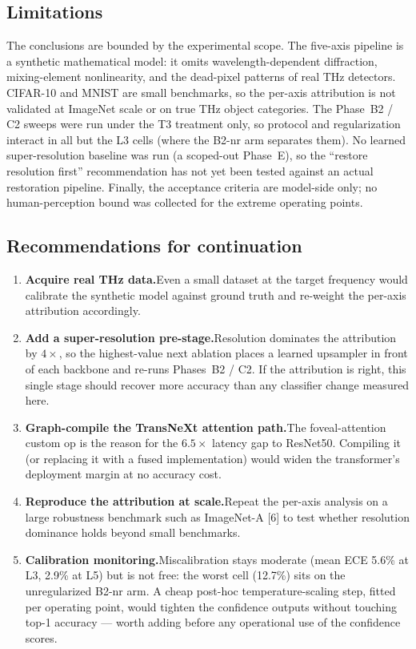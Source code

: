\subsection{Limitations}
The conclusions are bounded by the experimental scope. The five-axis pipeline
is a synthetic mathematical model: it omits wavelength-dependent diffraction,
mixing-element nonlinearity, and the dead-pixel patterns of real THz
detectors. CIFAR-10 and MNIST are small benchmarks, so the per-axis
attribution is not validated at ImageNet scale or on true THz object
categories. The Phase~B2 / C2 sweeps were run under the T3 treatment only, so
protocol and regularization interact in all but the L3 cells (where the
B2-nr arm separates them). No learned super-resolution baseline was run (a
scoped-out Phase~E), so the ``restore resolution first'' recommendation has
not yet been tested against an actual restoration pipeline. Finally, the
acceptance criteria are model-side only; no human-perception bound was
collected for the extreme operating points.

\subsection{Recommendations for continuation}
\begin{enumerate}
  \item \textbf{Acquire real THz data.}\quad Even a small dataset at the
        target frequency would calibrate the synthetic model against ground
        truth and re-weight the per-axis attribution accordingly.
  \item \textbf{Add a super-resolution pre-stage.}\quad Resolution dominates
        the attribution by $4\times$, so the highest-value next ablation
        places a learned upsampler in front of each backbone and re-runs
        Phases~B2 / C2. If the attribution is right, this single stage
        should recover more accuracy than any classifier change measured
        here.
  \item \textbf{Graph-compile the TransNeXt attention path.}\quad The
        foveal-attention custom op is the reason for the $6.5\times$ latency
        gap to ResNet50. Compiling it (or replacing it with a fused
        implementation) would widen the transformer's deployment margin at
        no accuracy cost.
  \item \textbf{Reproduce the attribution at scale.}\quad Repeat the
        per-axis analysis on a large robustness benchmark such as
        ImageNet-A [6] to test whether resolution dominance
        holds beyond small benchmarks.
  \item \textbf{Calibration monitoring.}\quad Miscalibration stays moderate
        (mean ECE 5.6\% at L3, 2.9\% at L5) but is not free: the worst cell
        (12.7\%) sits on the unregularized B2-nr arm. A cheap post-hoc
        temperature-scaling step, fitted per operating point, would tighten
        the confidence outputs without touching top-1 accuracy --- worth
        adding before any operational use of the confidence scores.
\end{enumerate}
